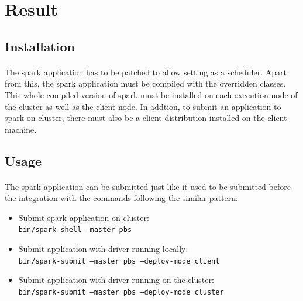 \section{Result}

\subsection{Installation}
\paragraph{}
The \gls{spark} application has to be patched to allow setting 
as a scheduler. Apart from this, the \gls{spark} application must be compiled
with the overridden classes. This whole compiled version of \gls{spark} must be
installed on each execution node of the cluster as well as the client node.
In addtion, to submit an application to \gls{spark} on  cluster,
there must also be a  client distribution installed on the client
machine.

\subsection{Usage}
\paragraph{}
The \gls{spark} application can be submitted just like it used to be submitted
before the  integration with the commands following the similar
pattern:

\begin{samepage}
    \begin{itemize}
        \item Submit \gls{spark} application on  cluster:\\
            \texttt{bin/spark-shell --master pbs}

        \item Submit application with \gls{driver} running locally:\\
            \texttt{bin/spark-submit --master pbs --deploy-mode client}

        \item Submit application with \gls{driver} running on the cluster:\\
            \texttt{bin/spark-submit --master pbs --deploy-mode cluster}
    \end{itemize}
\end{samepage}


